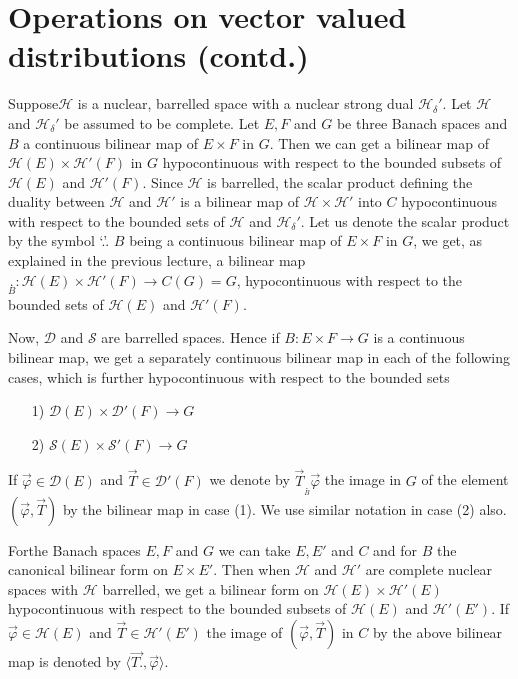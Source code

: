 
\chapter{Operations on vector valued 
  distributions (contd.)}\label{chap15}

Suppose\pageoriginale $\mathscr{H}$ is a nuclear, barrelled space with
a nuclear strong dual $\mathscr{H}_\delta'$. Let $\mathscr{H}$ and
$\mathscr{H}_\delta'$ be assumed to be complete. Let $E, F$ and $G$ be
three Banach spaces and $B$ a continuous bilinear map of $E \times F$
in $G$. Then we can get a bilinear map of $\mathscr{H}(E) \times
\mathscr{H}'(F)$ in $G$ hypocontinuous with respect to the bounded
subsets of $\mathscr{H}(E)$ and $\mathscr{H}'(F)$. Since $\mathscr{H}$
is barrelled, the scalar product defining the duality between
$\mathscr{H}$ and $\mathscr{H}'$ is a bilinear map of $\mathscr{H}
\times \mathscr{H}'$ into $C$ hypocontinuous with respect to the
bounded sets of $\mathscr{H}$ and $\mathscr{H}_\delta'$. Let us denote
the scalar product by the symbol `.'. $B$ being a continuous
bilinear map of $E \times F$ in $G$, we get, as explained in the
previous lecture, a bilinear map $\underset{B}{.} : \mathscr{H}(E)
\times \mathscr{H}'(F) \to C(G) = G$, hypocontinuous with respect to
the bounded sets of $\mathscr{H}(E)$ and $\mathscr{H}'(F)$.

Now, $\mathscr{D}$ and $\mathscr{S}$ are barrelled spaces. Hence if $B
: E \times F \to G$ is a continuous bilinear map, we get a separately
continuous bilinear map in each of the following cases, which is
further hypocontinuous with respect to the bounded sets

\begin{enumerate}
\item [1)] $\mathscr{D}(E) \times \mathscr{D}'(F) \to G$
\item [2)] $\mathscr{S}(E) \times \mathscr{S}'(F) \to G$
\end{enumerate}
If $\overrightarrow{\varphi} \in \mathscr{D}(E)$ and
$\overrightarrow{T} \in \mathscr{D}'(F)$ we denote by
$\overrightarrow{T}_{\underset{B}{.}} \overrightarrow{\varphi}$ the image in
$G$ of the element $(\overrightarrow{\varphi}, \overrightarrow{T})$ by
the bilinear map in case (1). We use similar notation in case (2)
also. 

For\pageoriginale the Banach spaces $E, F$ and $G$ we can take $E, E'$
and $C$ and for $B$ the canonical bilinear form on $E \times E'$. Then
when $\mathscr{H}$ and $\mathscr{H}'$ are complete nuclear spaces with
$\mathscr{H}$ barrelled, we get a bilinear form on $\mathscr{H}(E)
\times \mathscr{H}'(E)$ hypocontinuous with respect to the bounded
subsets of $\mathscr{H}(E)$ and $\mathscr{H}'(E')$. If
$\overrightarrow{\varphi} \in \mathscr{H}(E)$ and $\overrightarrow{T}
\in \mathscr{H}'(E')$ the image of $(\overrightarrow{\varphi},
\overrightarrow{T})$ in $C$ by the above bilinear map is denoted by
$\langle \overrightarrow{T.}, \overrightarrow{\varphi}\rangle$. 

